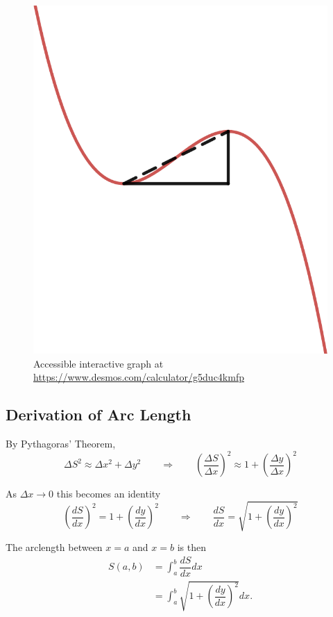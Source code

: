 \documentclass[12pt,a4paper]{article}
\begin{document}
\begin{figure}[!hptb]
\begin{center}
\includegraphics[height=0.25\textheight]{arclengthdx} \caption{Accessible interactive graph at \url{https://www.desmos.com/calculator/g5duc4kmfp}}\label{arclengthdx}
\end{center}
\end{figure}


\subsection{Derivation of Arc Length}

By Pythagoras' Theorem,
\[
\Delta S^2 \approx \Delta x^2+\Delta y^2
\qquad \Rightarrow\qquad
\left(\dfrac{\Delta S}{\Delta x}\right)^2 \approx 1+\left(\dfrac{\Delta y}{\Delta x}\right)^2
\]

As \(\Delta x\to0\) this becomes an identity
\[
\left(\dfrac{dS}{dx}\right)^2 = 1+\left(\dfrac{dy}{dx}\right)^2
\qquad\Rightarrow\qquad
\dfrac{dS}{dx} = \sqrt{1+\left(\dfrac{dy}{dx}\right)^2}
\]

The arclength between \(x=a\) and \(x=b\) is then
\[
\begin{aligned}
  S(a,b) &= \int_a^b\dfrac{dS}{dx}dx\\
  &= \int_a^b\sqrt{1+\left(\dfrac{dy}{dx}\right)^2}dx.
\end{aligned}
\]
\end{document}
